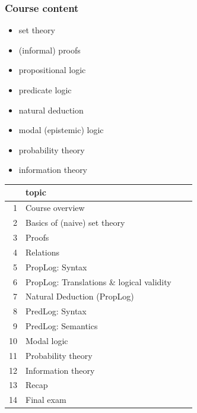 \documentclass[fleqn,10pt,serif,xcolor=svgnames,xcolor=table,aspectratio=169,handout]{beamer}
\begin{document}
\begin{frame}
  \frametitle{Course content}

  \begin{minipage}{0.42\linewidth}

    \begin{itemize}
      \item set theory
      \item (informal) proofs
      \item propositional logic
      \item predicate logic
      \item natural deduction
      \item modal (epistemic) logic
      \item probability theory
      \item information theory
    \end{itemize}
  \end{minipage}
  \hfill
  \begin{minipage}{0.57\linewidth}
    \begin{tabular}{rlll}
          & topic\\ \midrule
      1   & Course overview \      \\%
      2   & Basics of (naive) set theory\\
      3   & Proofs\\
      4   & Relations \            \\%
      5   & PropLog: Syntax \      \\%
      6   & PropLog: Translations \& logical validity\\
      7   & Natural Deduction (PropLog) \\
      8   & PredLog: Syntax \      \\%
      9   & PredLog: Semantics \   \\%
      10  & Modal logic\\
      11  & Probability theory\\
      12  & Information theory\\
      13  & Recap\\
      14  & Final exam\\
    \end{tabular}
  \end{minipage}
\end{frame}
\end{document}
